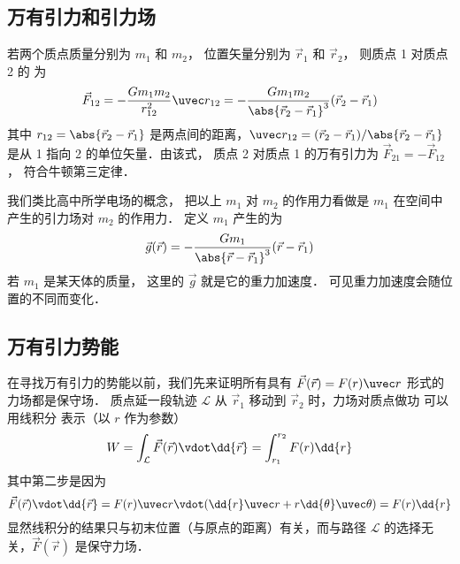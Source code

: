 

\subsection{万有引力和引力场}

若两个质点质量分别为 $m_1$ 和 $m_2$， 位置矢量分别为 $\vec r_1$ 和 $\vec r_2$， 则质点 1 对质点 2 的 为
\begin{equation}\label{Gravty_eq1}
\vec F_{12} =  - \frac{G m_1 m_2}{r_{12}^2} \uvec r_{12} = - \frac{G m_1 m_2}{\abs{\vec r_2 - \vec r_1}^3}(\vec r_2 - \vec r_1)
\end{equation}
其中 $r_{12} = \abs{\vec r_2 - \vec r_1}$ 是两点间的距离，$\uvec r_{12} = (\vec r_2 - \vec r_1)/\abs{\vec r_2 - \vec r_1}$ 是从 1 指向 2 的单位矢量．由该式， 质点 2 对质点 1 的万有引力为 $\vec F_{21} = -\vec F_{12}$， 符合牛顿第三定律．

我们类比高中所学电场的概念， 把以上 $m_1$ 对 $m_2$ 的作用力看做是 $m_1$ 在空间中产生的引力场对 $m_2$ 的作用力． 定义 $m_1$ 产生的为
\begin{equation}\label{Gravty_eq2}
\vec g(\vec r) = -\frac{Gm_1}{\abs{\vec r - \vec r_1} ^3}(\vec r - \vec r_1)
\end{equation}
若 $m_1$ 是某天体的质量， 这里的 $\vec g$ 就是它的重力加速度． 可见重力加速度会随位置的不同而变化．

\subsection{万有引力势能}

在寻找万有引力的势能以前，我们先来证明所有具有 $\vec F(\vec r) = F(r) \uvec r$ 形式的力场都是保守场． 质点延一段轨迹 $\mathcal{L}$ 从 $\vec r_1$ 移动到 $\vec r_2$ 时，力场对质点做功 可以用线积分 表示（以 $r$ 作为参数）
\begin{equation}\label{Gravty_eq3}
W = \int_\mathcal{L} \vec F(\vec r) \vdot \dd{\vec r} = \int_{r_1}^{r_2} F(r) \dd{r}
\end{equation}
其中第二步是因为
\begin{equation}
\vec F(\vec r) \vdot \dd{\vec r} = F(r)\uvec  r \vdot (\dd{r} \uvec  r + r\dd{\theta} \uvec \theta ) = F(r) \dd{r}
\end{equation}
显然线积分的结果只与初末位置（与原点的距离）有关，而与路径 $\mathcal{L}$ 的选择无关，$\vec F(\vec r)$ 是保守力场．

